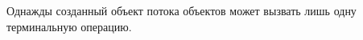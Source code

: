 \begin{frame}
\frametitle{\insertsection} 
\framesubtitle{\insertsubsection}
Однажды созданный объект потока объектов может вызвать лишь одну терминальную операцию.

\inputminted{java}{code/OneTermination.java}
\end{frame}